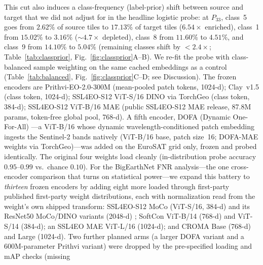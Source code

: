 \documentclass[journal]{IEEEtran}
\renewcommand{\_}{\textunderscore\allowbreak}
\begin{document}
This cut also induces a class-frequency (label-prior) shift
between source and target that we did not adjust for in the headline logistic probe: at $P_{33}$, class~5
goes from $2.62\%$ of source tiles to $17.13\%$ of target tiles ($6.54\times$ enriched), class~1 from
$15.02\%$ to $3.16\%$ ($\sim\!4.7\times$ depleted), class~8 from $11.60\%$ to $4.51\%$, and class~9 from
$14.10\%$ to $5.04\%$ (remaining classes shift by ${<}2.4\times$; Table~\ref{tab:classprior},
Fig.~\ref{fig:classprior}A--B). We
re-fit the probe with class-balanced sample weighting on the same cached embeddings as a control
(Table~\ref{tab:balanced}, Fig.~\ref{fig:classprior}C--D; see Discussion). The frozen encoders are Prithvi-EO-2.0-300M \citep{szwarcman2024prithvi} (mean-pooled patch tokens, 1024-d); Clay~v1.5 \citep{clay2024model}
(class token, 1024-d); SSL4EO-S12 \citep{wang2023ssl4eo} ViT-S/16 DINO via TorchGeo (class token, 384-d); SSL4EO-S12 \citep{wang2023ssl4eo} ViT-B/16 MAE
(public SSL4EO-S12 MAE release, 87.8M params, token-free global pool, 768-d). A fifth
encoder, DOFA (Dynamic One-For-All) \citep{xiong2024dofa}---a ViT-B/16 whose dynamic
wavelength-conditioned patch embedding ingests the Sentinel-2 bands natively (ViT-B/16 base, patch size~16;
DOFA-MAE weights via TorchGeo)---was added on the EuroSAT grid only, frozen and probed
identically. The original four weights load cleanly (in-distribution probe accuracy
$0.95$--$0.99$ vs.\ chance $0.10$).
For the BigEarthNet FNR analysis---the one cross-encoder comparison that turns on statistical power---we
expand this battery to \emph{thirteen} frozen encoders by adding eight more loaded through first-party
published first-party weight distributions, each with normalization read from the weight's own shipped transform: SSL4EO-S12 MoCo
(ViT-S/16, 384-d) and its ResNet50 MoCo/DINO variants (2048-d) \citep{wang2023ssl4eo}; SoftCon
\citep{wang2024softcon} ViT-B/14 (768-d) and ViT-S/14 (384-d); an SSL4EO MAE ViT-L/16 (1024-d); and
CROMA \citep{fuller2023croma} Base (768-d) and Large (1024-d). Two further planned arms
(a larger DOFA variant and a 600M-parameter Prithvi variant) were dropped by the pre-specified loading and mAP checks (missing
\end{document}
